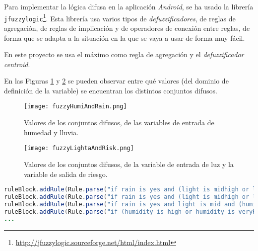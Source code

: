 Para implementar la lógica difusa en la aplicación \textit{Android}, se ha usado la librería \texttt{jfuzzylogic}\footnote{\url{http://jfuzzylogic.sourceforge.net/html/index.html}}. Esta librería usa varios tipos de \textit{defuzzificadores}, de reglas de agregación, de reglas de implicación y de operadores de conexión entre reglas, de forma que se adapta a la situación en la que se vaya a usar de forma muy fácil. 

En este proyecto se usa el máximo como regla de agregación y el \textit{defuzzificador} \textit{centroid}.

En las Figuras \ref{fig:fuzzyHumiAndRain} y \ref{fig:fuzzyLightaAndRisk} se pueden observar entre qué valores (del dominio de definición de la variable) se encuentran los distintos conjuntos difusos.

\begin{figure}[!h]
\begin{center}
\texttt{[image: fuzzyHumiAndRain.png]}
\caption{Valores de los conjuntos difusos, de las variables de entrada de humedad y lluvia.}
\label{fig:fuzzyHumiAndRain}
\end{center}
\end{figure}

\begin{figure}[!h]
\begin{center}
\texttt{[image: fuzzyLightaAndRisk.png]}
\caption{Valores de los conjuntos difusos, de la variable de entrada de luz y la variable de salida de riesgo.}
\label{fig:fuzzyLightaAndRisk}
\end{center}
\end{figure}

\begin{lstlisting}[language=java,captionpos=t,caption={\textbf{Algunas de las reglas difusas definidas para obtener el grado de pertenencia de una variable de salida a los conjuntos difusos.}},label={lst:fuzzyRules}]
ruleBlock.addRule(Rule.parse("if rain is yes and (light is midhigh or light is maximum) and (humidity is veryLow or humidity is low or humidity is mid) then risk is low", engine));
ruleBlock.addRule(Rule.parse("if rain is yes and (light is midhigh or light is maximum) and (humidity is high or humidity is veryHigh) then risk is mid", engine));
ruleBlock.addRule(Rule.parse("if rain is yes and light is mid and (humidity is veryLow or humidity is low or humidity is mid) then risk is mid", engine));
ruleBlock.addRule(Rule.parse("if (humidity is high or humidity is veryHigh) and rain is yes then risk is high", engine));
...
\end{lstlisting}

